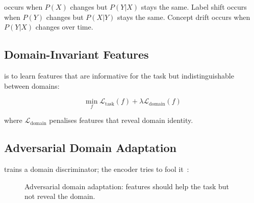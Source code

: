  occurs when $P(X)$ changes but $P(Y|X)$ stays the same. Label shift occurs when $P(Y)$ changes but $P(X|Y)$ stays the same. Concept drift occurs when $P(Y|X)$ changes over time.

\subsection{Domain-Invariant Features}

 is to learn features that are informative for the task but indistinguishable between domains:

\begin{equation}
    \min_f \mathcal{L}_{\text{task}}(f) + \lambda \mathcal{L}_{\text{domain}}(f)
\end{equation}

where $\mathcal{L}_{\text{domain}}$ penalises features that reveal domain identity.

\subsection{Adversarial Domain Adaptation}

 trains a domain discriminator; the encoder tries to fool it~\cite{Ganin2016DomainAdversarial}:

\begin{figure}
\centering
{}
\caption{Adversarial domain adaptation: features should help the task but not reveal the domain.}
\label{fig:domain_adaptation}
\end{figure}



